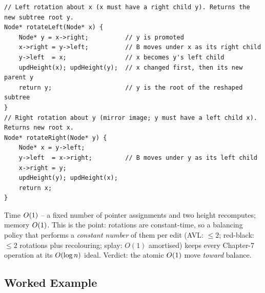 \begin{lstlisting}[caption={Left and right rotations about a node -- the atomic move reused by AVL, red-black and splay}, label={lst:c06-rotcode}]
// Left rotation about x (x must have a right child y). Returns the new subtree root y.
Node* rotateLeft(Node* x) {
    Node* y = x->right;          // y is promoted
    x->right = y->left;          // B moves under x as its right child
    y->left  = x;                // x becomes y's left child
    updHeight(x); updHeight(y);  // x changed first, then its new parent y
    return y;                    // y is the root of the reshaped subtree
}
// Right rotation about y (mirror image; y must have a left child x). Returns new root x.
Node* rotateRight(Node* y) {
    Node* x = y->left;
    y->left  = x->right;         // B moves under y as its left child
    x->right = y;
    updHeight(y); updHeight(x);
    return x;
}
\end{lstlisting}
\begin{complexitybox}
Time $O(1)$ -- a fixed number of pointer assignments and two height recomputes; memory $O(1)$.
This is the point: rotations are constant-time, so a balancing policy that performs a \emph{constant
number} of them per edit (AVL: $\le 2$; red-black: $\le 2$ rotations plus recolouring; splay: $O(1)$
amortised) keeps every Chapter-7 operation at its $O(\log n)$ ideal. Verdict: the atomic
$O(1)$ move \emph{toward} balance.
\end{complexitybox}

\subsection{Worked Example}

